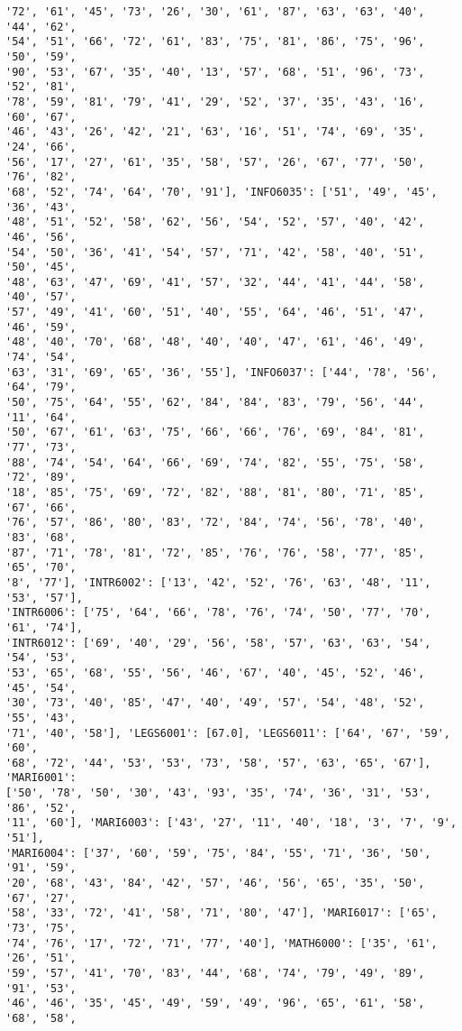\documentclass[11pt]{article}
\begin{document}
\begin{Verbatim}[commandchars=\\\{\}]
'72', '61', '45', '73', '26', '30', '61', '87', '63', '63', '40', '44', '62',
'54', '51', '66', '72', '61', '83', '75', '81', '86', '75', '96', '50', '59',
'90', '53', '67', '35', '40', '13', '57', '68', '51', '96', '73', '52', '81',
'78', '59', '81', '79', '41', '29', '52', '37', '35', '43', '16', '60', '67',
'46', '43', '26', '42', '21', '63', '16', '51', '74', '69', '35', '24', '66',
'56', '17', '27', '61', '35', '58', '57', '26', '67', '77', '50', '76', '82',
'68', '52', '74', '64', '70', '91'], 'INFO6035': ['51', '49', '45', '36', '43',
'48', '51', '52', '58', '62', '56', '54', '52', '57', '40', '42', '46', '56',
'54', '50', '36', '41', '54', '57', '71', '42', '58', '40', '51', '50', '45',
'48', '63', '47', '69', '41', '57', '32', '44', '41', '44', '58', '40', '57',
'57', '49', '41', '60', '51', '40', '55', '64', '46', '51', '47', '46', '59',
'48', '40', '70', '68', '48', '40', '40', '47', '61', '46', '49', '74', '54',
'63', '31', '69', '65', '36', '55'], 'INFO6037': ['44', '78', '56', '64', '79',
'50', '75', '64', '55', '62', '84', '84', '83', '79', '56', '44', '11', '64',
'50', '67', '61', '63', '75', '66', '66', '76', '69', '84', '81', '77', '73',
'88', '74', '54', '64', '66', '69', '74', '82', '55', '75', '58', '72', '89',
'18', '85', '75', '69', '72', '82', '88', '81', '80', '71', '85', '67', '66',
'76', '57', '86', '80', '83', '72', '84', '74', '56', '78', '40', '83', '68',
'87', '71', '78', '81', '72', '85', '76', '76', '58', '77', '85', '65', '70',
'8', '77'], 'INTR6002': ['13', '42', '52', '76', '63', '48', '11', '53', '57'],
'INTR6006': ['75', '64', '66', '78', '76', '74', '50', '77', '70', '61', '74'],
'INTR6012': ['69', '40', '29', '56', '58', '57', '63', '63', '54', '54', '53',
'53', '65', '68', '55', '56', '46', '67', '40', '45', '52', '46', '45', '54',
'30', '73', '40', '85', '47', '40', '49', '57', '54', '48', '52', '55', '43',
'71', '40', '58'], 'LEGS6001': [67.0], 'LEGS6011': ['64', '67', '59', '60',
'68', '72', '44', '53', '53', '73', '58', '57', '63', '65', '67'], 'MARI6001':
['50', '78', '50', '30', '43', '93', '35', '74', '36', '31', '53', '86', '52',
'11', '60'], 'MARI6003': ['43', '27', '11', '40', '18', '3', '7', '9', '51'],
'MARI6004': ['37', '60', '59', '75', '84', '55', '71', '36', '50', '91', '59',
'20', '68', '43', '84', '42', '57', '46', '56', '65', '35', '50', '67', '27',
'58', '33', '72', '41', '58', '71', '80', '47'], 'MARI6017': ['65', '73', '75',
'74', '76', '17', '72', '71', '77', '40'], 'MATH6000': ['35', '61', '26', '51',
'59', '57', '41', '70', '83', '44', '68', '74', '79', '49', '89', '91', '53',
'46', '46', '35', '45', '49', '59', '49', '96', '65', '61', '58', '68', '58',

\end{Verbatim}
\end{document}
